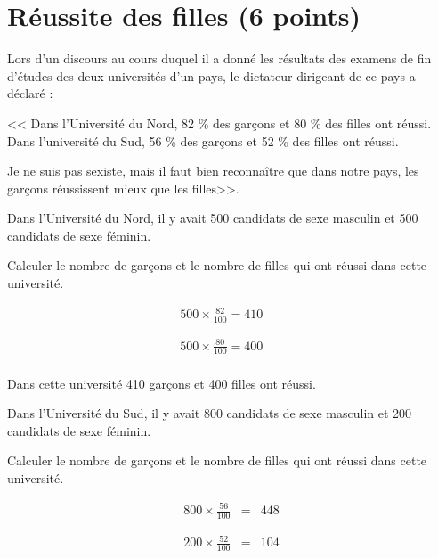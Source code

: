 \section{Réussite des filles (6 points)}

Lors d'un discours au cours duquel il a donné les résultats des examens de fin d'études des deux universités d'un pays, le dictateur dirigeant de ce pays a déclaré :

<< Dans l'Université du Nord, 82 \% des garçons et 80 \% des filles ont réussi. Dans l'université du Sud, 56 \% des garçons et 52 \% des filles ont réussi.

Je ne suis pas sexiste, mais il faut bien reconnaître que dans notre pays, les garçons réussissent mieux que les filles>>.

\begin{questions}
	\question[1\half] Dans l'Université du Nord, il y avait 500 candidats de sexe masculin et 500 candidats de sexe féminin.
	
	Calculer le nombre de garçons et le nombre de filles qui ont réussi dans cette université.
	

	\begin{solution}
		\begin{eqnarray*}
			500 \times \frac{82}{100} = 410 \\ 
			& & \\
			& & \\
			500 \times \frac{80}{100} = 400 \\
		\end{eqnarray*}
			

		
		Dans cette université 410 garçons et 400 filles ont réussi.
		
	\end{solution}
	
	\question Dans l'Université du Sud, il y avait 800 candidats de sexe masculin et 200 candidats de sexe féminin.
	
	Calculer le nombre de garçons et le nombre de filles qui ont réussi dans cette université.
	\begin{solution}
		\begin{eqnarray*}
			800 \times \frac{56}{100} & = & 448 \\ 
			& & \\
			& & \\
			200 \times \frac{52}{100} & = & 104 
		\end{eqnarray*}
			 

\end{solution}
\end{questions}
